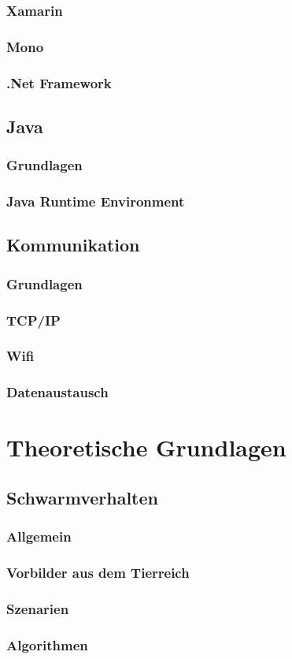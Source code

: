 \subsubsection*{Xamarin}
\subsubsection{Mono}
\subsubsection{.Net Framework}

\subsection{Java} %

\subsubsection{Grundlagen}
\subsubsection{Java Runtime Environment}

\subsection{Kommunikation} %

\subsubsection{Grundlagen}
\subsubsection{TCP/IP}
\subsubsection{Wifi}
\subsubsection{Datenaustausch} %

\section{Theoretische Grundlagen}

\subsection{Schwarmverhalten}
\subsubsection{Allgemein}
\subsubsection{Vorbilder aus dem Tierreich}
\subsubsection{Szenarien}
\subsubsection{Algorithmen}
